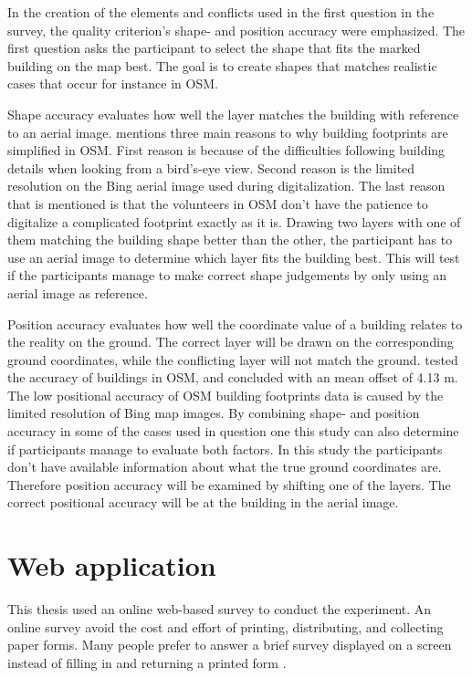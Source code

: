 
In the creation of the elements and conflicts used in the first question in the survey, the quality criterion's shape- and position accuracy were emphasized. The first question asks the participant to select the shape that fits the marked building on the map best. The goal is to create shapes that matches realistic cases that occur for instance in OSM. 

Shape accuracy evaluates how well the layer matches the building with reference to an aerial image. \cite{Fan2014} mentions three main reasons to why building footprints are simplified in OSM. First reason is because of the difficulties following building details when looking from a bird's-eye view. Second reason is the limited resolution on the Bing aerial image used during digitalization. The last reason that is mentioned is that the volunteers in OSM don't have the patience to digitalize a complicated footprint exactly as it is. Drawing two layers with one of them matching the building shape better than the other, the participant has to use an aerial image to determine which layer fits the building best. This will test if the participants manage to make correct shape judgements by only using an aerial image as reference. 

Position accuracy evaluates how well the coordinate value of a building relates to the reality on the ground. The correct layer will be drawn on the corresponding ground coordinates, while the conflicting layer will not match the ground. \cite{Fan2014} tested the accuracy of buildings in OSM, and concluded with an mean offset of 4.13 m. The low positional accuracy of OSM building footprints data is caused by the limited resolution of Bing map images. By combining shape- and position accuracy in some of the cases used in question one this study can also determine if participants manage to evaluate both factors. In this study the participants don't have available information about what the true ground coordinates are. Therefore position accuracy will be examined by shifting one of the layers. The correct positional accuracy will be at the building in the aerial image. 

\section{Web application}
This thesis used an online web-based survey to conduct the experiment. An online survey avoid the cost and effort of printing, distributing, and collecting paper forms. Many people prefer to answer a brief survey displayed on a screen instead of filling in and returning a printed form \citep{Ben2009}.   


